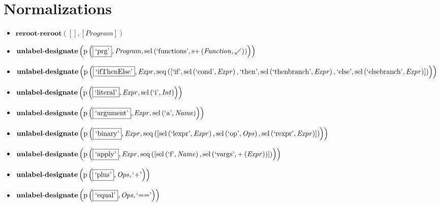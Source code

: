 \section{Normalizations}
{\footnotesize\begin{itemize}
\item $\mathbf{reroot\text{-}reroot}\left([],[\mathit{Program}]\right)$
\item $\mathbf{unlabel\text{-}designate}\\\left(\mathrm{p}\left(\fbox{\text{`prg'}},\mathit{Program},\mathrm{sel}\left(\text{`functions'},\mathrm{s}{+}\left(\mathit{Function},{\swarrow}\right)\right)\right)\right)$
\item $\mathbf{unlabel\text{-}designate}\\\left(\mathrm{p}\left(\fbox{\text{`ifThenElse'}},\mathit{Expr},\mathrm{seq}\left(\left[\text{`if'}, \mathrm{sel}\left(\text{`cond'},\mathit{Expr}\right), \text{`then'}, \mathrm{sel}\left(\text{`thenbranch'},\mathit{Expr}\right), \text{`else'}, \mathrm{sel}\left(\text{`elsebranch'},\mathit{Expr}\right)\right]\right)\right)\right)$
\item $\mathbf{unlabel\text{-}designate}\\\left(\mathrm{p}\left(\fbox{\text{`literal'}},\mathit{Expr},\mathrm{sel}\left(\text{`i'},\mathit{Int}\right)\right)\right)$
\item $\mathbf{unlabel\text{-}designate}\\\left(\mathrm{p}\left(\fbox{\text{`argument'}},\mathit{Expr},\mathrm{sel}\left(\text{`a'},\mathit{Name}\right)\right)\right)$
\item $\mathbf{unlabel\text{-}designate}\\\left(\mathrm{p}\left(\fbox{\text{`binary'}},\mathit{Expr},\mathrm{seq}\left(\left[\mathrm{sel}\left(\text{`lexpr'},\mathit{Expr}\right), \mathrm{sel}\left(\text{`op'},\mathit{Ops}\right), \mathrm{sel}\left(\text{`rexpr'},\mathit{Expr}\right)\right]\right)\right)\right)$
\item $\mathbf{unlabel\text{-}designate}\\\left(\mathrm{p}\left(\fbox{\text{`apply'}},\mathit{Expr},\mathrm{seq}\left(\left[\mathrm{sel}\left(\text{`f'},\mathit{Name}\right), \mathrm{sel}\left(\text{`vargs'},{+}\left(\mathit{Expr}\right)\right)\right]\right)\right)\right)$
\item $\mathbf{unlabel\text{-}designate}\\\left(\mathrm{p}\left(\fbox{\text{`plus'}},\mathit{Ops},\text{`+'}\right)\right)$
\item $\mathbf{unlabel\text{-}designate}\\\left(\mathrm{p}\left(\fbox{\text{`equal'}},\mathit{Ops},\text{`=='}\right)\right)$

\end{itemize}}

